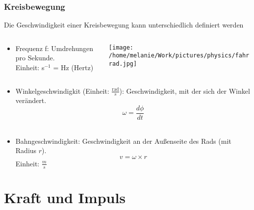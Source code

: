 \documentclass{beamer}
\begin{document}
\begin{frame}
\frametitle{Kreisbewegung}

Die Geschwindigkeit einer Kreisbewegung kann unterschiedlich definiert werden


\begin{columns}[c]

\begin{column}{8cm}

\begin{itemize}
\item
Frequenz f: Umdrehungen pro Sekunde. \\
Einheit: s$^{-1}$ =  Hz (Hertz) \\

\end{itemize}

\end{column}

\begin{column}{3cm}
\begin{center}
\texttt{[image: /home/melanie/Work/pictures/physics/fahrrad.jpg]}
\end{center}
\end{column}


\end{columns}




\begin{itemize}
\item
Winkelgeschwindigkit (Einheit: \(\frac{\text{rad}}{s}\)): Geschwindigkeit, mit der sich der Winkel verändert. 
\[
\omega = \frac{d\phi}{dt} 
\]
\\
\item
Bahngeschwindigkeit: Geschwindigkeit an der Außenseite des Rads (mit Radius \(r\)). 
\[
v = \omega \times r
\]
Einheit: \(\frac{m}{s}\)
\end{itemize}


\end{frame}










\section{Kraft und Impuls}
\end{document}
